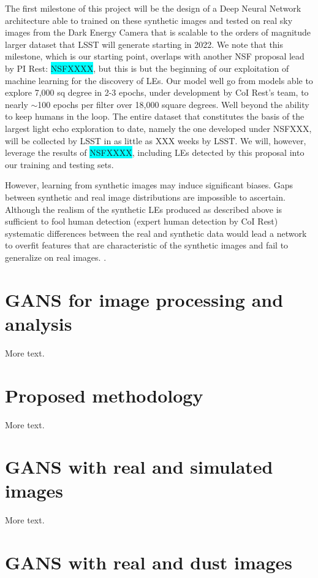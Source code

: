 \documentclass{proposalnsf}
\newcommand{\armin}[1]{\colorbox{cyan}{#1}}
\begin{document}
The first milestone of this project will be the design of a Deep Neural Network architecture able to trained on these synthetic images and tested on real sky images from the Dark Energy Camera that is scalable to the orders of magnitude larger dataset that LSST will generate starting in 2022. We note that this milestone, which is our starting point, overlaps with another NSF proposal lead by PI Rest: \armin{NSFXXXX}, but this is but the beginning of our exploitation of machine learning for the discovery of LEs. Our model well go from models able to explore 7,000 sq degree in 2-3 epochs, under development by CoI Rest's team, to nearly $\sim$100 epochs per filter over 18,000 square degrees. Well beyond the ability to keep humans in the loop. The entire dataset that constitutes the basis of the largest light echo exploration to date, namely the one developed under NSFXXX, will be collected by LSST in as little as XXX weeks by LSST.  
We will, however, leverage the results of \armin{NSFXXXX}, including LEs detected by this proposal into our training and testing sets.



However, learning from synthetic
images may induce significant biases.  Gaps between synthetic and real image distributions are impossible to ascertain.  Although the realism of the synthetic LEs produced as described above is sufficient to fool human detection (expert human detection by CoI Rest) systematic differences between the real and synthetic data would lead a network to overfit features that are characteristic of the synthetic images and fail to
generalize on real images.  \citep{Shrivastava_2017_CVPR}.  


\section{GANS for image processing and analysis}

More text.

\section{Proposed methodology}

More text.
\section{GANS with real and simulated images}

More text.

\section{GANS with real and dust images}
\end{document}
